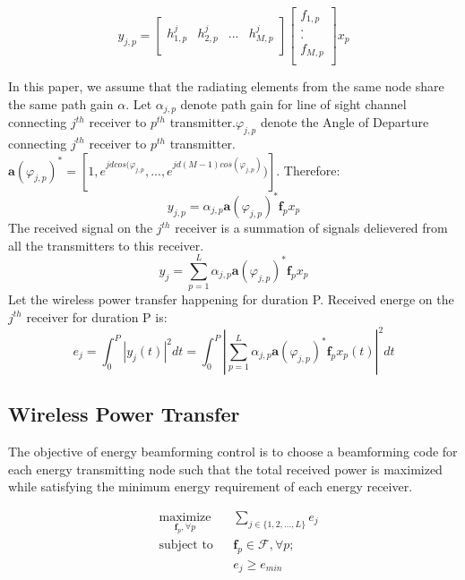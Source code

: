 \documentclass[journal]{IEEEtran}
\begin{document}
\[
y_{j,p}=
\begin{bmatrix}
h_{1,p}^j & h_{2,p}^j & ... & h_{M,p}^j\\
\end{bmatrix}
\begin{bmatrix}
f_{1,p}\\
.\\
.\\
f_{M,p}\\
\end{bmatrix}
x_p
\]



In this paper, we assume that the radiating elements from the same node share the same path gain $\alpha$. Let $\alpha_{j,p}$ denote path gain for line of sight channel connecting $j^{th}$ receiver to $p^{th}$ transmitter.$\varphi_{j,p}$ denote the Angle of Departure connecting $j^{th}$ receiver to $p^{th}$ transmitter. $\textbf{a}(\varphi_{j,p})^*=[1,e^{jdcos(\varphi_{j,p}},...,e^{jd(M-1)cos(\varphi_{j,p})})]$. Therefore:
\begin{equation}
y_{j,p}=\alpha_{j,p} \textbf{a}(\varphi_{j,p})^* \textbf{f}_p x_p
\end{equation}
The received signal on the $j^{th}$ receiver is a summation of signals delievered from all the transmitters to this receiver.
\begin{equation}
y_j=\sum_{p=1}^L \alpha_{j,p} \textbf{a}(\varphi_{j,p})^* \textbf{f}_p x_p
\end{equation}
Let the wireless power transfer happening for duration P. Received energe on the $j^{th}$ receiver for duration P is:
\begin{equation}
e_j=\int_0^P |y_j(t)|^2 dt=\int_0^P |\sum_{p=1}^L \alpha_{j,p} \textbf{a}(\varphi_{j,p})^* \textbf{f}_p x_p(t)|^2 dt
\end{equation}

\subsection{Wireless Power Transfer}

The objective of energy beamforming control is to choose a beamforming code for each energy transmitting node such that the total received power is maximized while satisfying the minimum energy requirement of each energy receiver.

\begin{equation*}
    \begin{aligned}
        & \underset{ \textbf{f}_p, \forall p}{\text{maximize}}
        && \displaystyle\sum_{j \in \{1,2,...,L\}} e_j\\
        & \text{subject to}
        && \textbf{f}_p \in \mathcal{F}, \forall p;\\
        &&& e_j \geq e_{min}\\
    \end{aligned}
\end{equation*}
\end{document}
